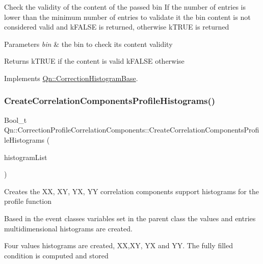 Check the validity of the content of the passed bin If the number of entries is lower than the minimum number of entries to validate it the bin content is not considered valid and k\+F\+A\+L\+SE is returned, otherwise k\+T\+R\+UE is returned 
\begin{DoxyParams}{Parameters}
{\em bin} & the bin to check its content validity \\
\hline
\end{DoxyParams}
\begin{DoxyReturn}{Returns}
k\+T\+R\+UE if the content is valid k\+F\+A\+L\+SE otherwise 
\end{DoxyReturn}


Implements \mbox{\hyperlink{classQn_1_1CorrectionHistogramBase_a4db2c92ceaffefaa91475a721612d80d}{Qn\+::\+Correction\+Histogram\+Base}}.

\mbox{\label{classQn_1_1CorrectionProfileCorrelationComponents_ad9ec714a26cdc2c76eb5be288f6f114e}} 
\subsubsection{\texorpdfstring{Create\+Correlation\+Components\+Profile\+Histograms()}{CreateCorrelationComponentsProfileHistograms()}}
{\footnotesize\ttfamily Bool\+\_\+t Qn\+::\+Correction\+Profile\+Correlation\+Components\+::\+Create\+Correlation\+Components\+Profile\+Histograms (\begin{DoxyParamCaption}\item[{T\+List $\ast$}]{histogram\+List }\end{DoxyParamCaption})}

Creates the XX, XY, YX, YY correlation components support histograms for the profile function

Based in the event classes variables set in the parent class the values and entries multidimensional histograms are created.

Four values histograms are created, XX,XY, YX and YY. The fully filled condition is computed and stored

